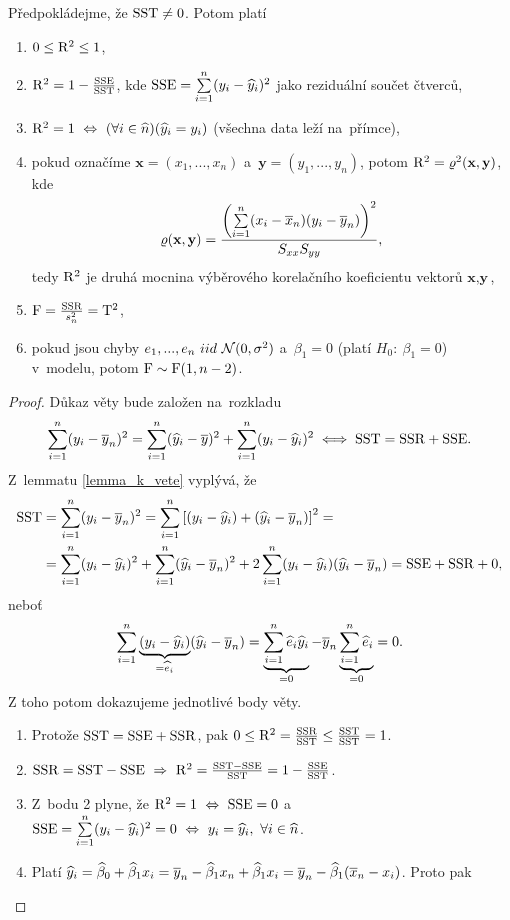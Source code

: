 \begin{theorem}\label{vetasbysxx}
	Předpokládejme, že $\mathrm{SST}\neq 0$. Potom platí\begin{enumerate}
		\item $0\leq \mathrm{R}^2\leq1$,
		\item $\mathrm{R}^2 = 1-\frac{\mathrm{SSE}}{\mathrm{SST}}$, kde $\mathrm{SSE} = \sum\limits_{i=1}^{n} (y_i-\widehat{y}_i)^2$ jako reziduální součet čtverců,
		\item $\mathrm{R}^2 = 1~\Leftrightarrow~(\forall i\in\widehat{n})(\widehat{y}_i = y_i)$ (všechna data leží na~přímce),
		\item pokud označíme $\textbf{x} = (x_1,...,x_n)$ a~$\textbf{y} = (y_1,...,y_n)$, potom $\mathrm{R}^2 = \varrho^2(\textbf{x},\textbf{y})$, kde $$ \varrho(\textbf{x},\textbf{y}) = \frac{ \left( \sum\limits_{i=1}^{n} (x_i-\overline{x}_n)(y_i-\overline{y}_n) \right)^2}{S_{xx} S_{yy}}, $$ tedy $\mathrm{R}^2$ je druhá mocnina výběrového korelačního koeficientu vektorů $\textbf{x},\textbf{y}$,
		\item $\mathrm{F} = \frac{\mathrm{SSR}}{s_n^2} = \mathrm{T}^2$,
		\item pokud jsou chyby $e_1,...,e_n~iid~\mathcal{N}(0,\sigma^2)$ a~$\beta_1 = 0$ (platí $H_0:~\beta_1 = 0$) v~modelu, potom $\mathrm{F}\sim\mathrm{F}(1,n-2)$.
	\end{enumerate}
\begin{proof}
	Důkaz věty bude založen na~rozkladu
	 $$ \sum\limits_{i=1}^{n} (y_i-\overline{y}_n)^2  = \sum\limits_{i=1}^{n} (\widehat{y}_i-\overline{y})^2 + \sum\limits_{i=1}^{n} (y_i-\widehat{y}_i)^2 \iff \mathrm{SST} = \mathrm{SSR}+\mathrm{SSE}.$$
	 Z~lemmatu \ref{lemma_k_vete} vyplývá, že
	\[
	\begin{split}
	\mathrm{SST}& = \sum\limits_{i=1}^{n} (y_i-\overline{y}_n)^2 = \sum\limits_{i=1}^{n} \left[(y_i-\widehat{y}_i)+(\widehat{y}_i-\overline{y}_n) \right]^2 = \\& = \sum\limits_{i=1}^{n} (y_i-\widehat{y}_i)^2+\sum\limits_{i=1}^{n} (\widehat{y}_i-\overline{y}_n)^2+2\sum\limits_{i=1}^{n} (y_i-\widehat{y}_i)(\widehat{y}_i-\overline{y}_n) = \mathrm{SSE}+\mathrm{SSR}+0,
	\end{split}
	\]
	neboť $$ \sum\limits_{i=1}^{n} \underbrace{(y_i-\widehat{y}_i)}_{ = \widehat{e}_i}(\widehat{y}_i-\overline{y}_n) = \underbrace{\sum\limits_{i=1}^{n} \widehat{e}_i\widehat{y}_i}_{ = 0}-\overline{y}_n\underbrace{\sum\limits_{i=1}^{n} \widehat{e}_i}_{ = 0} = 0. $$
	Z toho potom dokazujeme jednotlivé body věty. \begin{enumerate}
		\item Protože $\mathrm{SST} = \mathrm{SSE}+\mathrm{SSR}$, pak $0\leq \mathrm{R}^2 = \frac{\mathrm{SSR}}{\mathrm{SST}}\leq \frac{\mathrm{SST}}{\mathrm{SST}} = 1$.
		\item $\mathrm{SSR} = \mathrm{SST}-\mathrm{SSE}~\Rightarrow~\mathrm{R}^2 = \frac{\mathrm{SST}-\mathrm{SSE}}{\mathrm{SST}} = 1-\frac{\mathrm{SSE}}{\mathrm{SST}}$.
		\item Z~bodu 2 plyne, že $\mathrm{R}^2 = 1~\Leftrightarrow~\mathrm{SSE} = 0$ a~$\mathrm{SSE} = \sum\limits_{i=1}^{n} (y_i-\widehat{y}_i)^2 = 0~\Leftrightarrow~y_i = \widehat{y}_i, ~\forall i\in\widehat{n}$.
		\item Platí $\widehat{y}_i = \widehat{\beta}_0 + \widehat{\beta}_1 x_i = \overline{y}_n-\widehat{\beta}_1 x_n + \widehat{\beta}_1 x_i = \overline{y}_n-\widehat{\beta}_1(\overline{x}_n-x_i)$. Proto pak

\end{enumerate}
\end{proof}
\end{theorem}
